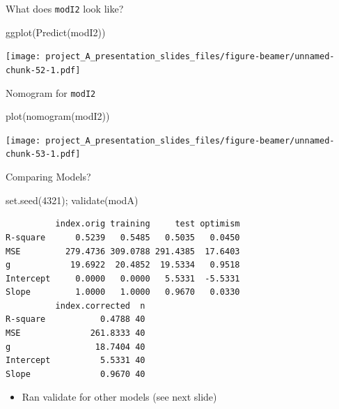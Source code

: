 \documentclass[
  ignorenonframetext,
]{beamer}
\newenvironment{Shaded}{\begin{snugshade}}{\end{snugshade}}
\newcommand{\DecValTok}[1]{\textcolor[rgb]{0.00,0.00,0.81}{#1}}
\newcommand{\FunctionTok}[1]{\textcolor[rgb]{0.00,0.00,0.00}{#1}}
\newcommand{\NormalTok}[1]{#1}
\providecommand{\tightlist}{%
  \setlength{\itemsep}{0pt}\setlength{\parskip}{0pt}}
\begin{document}
\begin{frame}[fragile]{What does \texttt{modI2} look like?}
\protect\hypertarget{what-does-modi2-look-like}{}
\begin{Shaded}
\begin{Highlighting}[]
\FunctionTok{ggplot}\NormalTok{(}\FunctionTok{Predict}\NormalTok{(modI2))}
\end{Highlighting}
\end{Shaded}

\texttt{[image: project\_A\_presentation\_slides\_files/figure-beamer/unnamed-chunk-52-1.pdf]}
\end{frame}

\begin{frame}[fragile]{Nomogram for \texttt{modI2}}
\protect\hypertarget{nomogram-for-modi2}{}
\begin{Shaded}
\begin{Highlighting}[]
\FunctionTok{plot}\NormalTok{(}\FunctionTok{nomogram}\NormalTok{(modI2))}
\end{Highlighting}
\end{Shaded}

\texttt{[image: project\_A\_presentation\_slides\_files/figure-beamer/unnamed-chunk-53-1.pdf]}
\end{frame}

\begin{frame}[fragile]{Comparing Models?}
\protect\hypertarget{comparing-models}{}
\begin{Shaded}
\begin{Highlighting}[]
\FunctionTok{set.seed}\NormalTok{(}\DecValTok{4321}\NormalTok{); }\FunctionTok{validate}\NormalTok{(modA)}
\end{Highlighting}
\end{Shaded}

\begin{verbatim}
          index.orig training     test optimism
R-square      0.5239   0.5485   0.5035   0.0450
MSE         279.4736 309.0788 291.4385  17.6403
g            19.6922  20.4852  19.5334   0.9518
Intercept     0.0000   0.0000   5.5331  -5.5331
Slope         1.0000   1.0000   0.9670   0.0330
          index.corrected  n
R-square           0.4788 40
MSE              261.8333 40
g                 18.7404 40
Intercept          5.5331 40
Slope              0.9670 40
\end{verbatim}

\begin{itemize}
\tightlist
\item
  Ran validate for other models (see next slide)
\end{itemize}
\end{frame}
\end{document}
